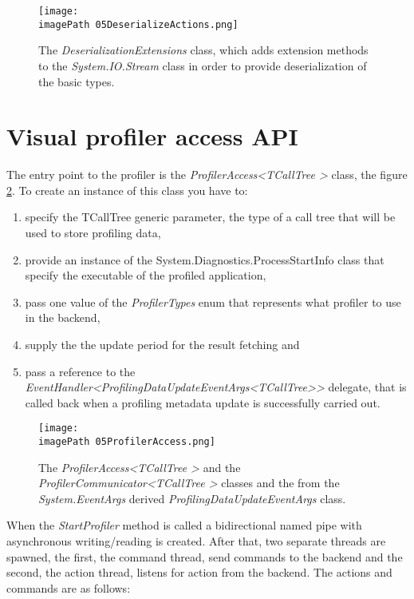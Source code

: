 \begin{figure}
	\centering
		\texttt{[image: \\imagePath 05DeserializeActions.png]}
		\caption{The \textit{DeserializationExtensions} class, which adds extension methods to the \textit{System.IO.Stream} class in order to provide deserialization of the basic types. }
	\label{fig:05DeserializeActions}
\end{figure}

\section{Visual profiler access API}
The entry point to the profiler is the \textit{ProfilerAccess\textless TCallTree \textgreater} class, the figure \ref{fig:05ProfilerAccess}. To create an instance of this class you have to:
\begin{enumerate}

\item specify the TCallTree generic parameter, the type of a call tree that will be used to store profiling data,

\item provide an instance of the System.Diagnostics.ProcessStartInfo class that specify the executable of the profiled application,

\item pass one value of the \textit{ProfilerTypes} enum that represents what profiler to use in the backend,

\item supply the the update period for the result fetching and

\item pass a reference to the \textit{EventHandler\textless ProfilingDataUpdateEventArgs\textless TCallTree\textgreater\textgreater} delegate, that is called back when a profiling metadata update is successfully carried out.
 
\end{enumerate}
\begin{figure}
	\centering
		\texttt{[image: \\imagePath 05ProfilerAccess.png]}
		\caption{The \textit{ProfilerAccess\textless TCallTree \textgreater} and
the \textit{ProfilerCommunicator\textless TCallTree \textgreater} 		
		 classes and the from the \textit{System.EventArgs} derived \textit{ProfilingDataUpdateEventArgs} class. }
	\label{fig:05ProfilerAccess}
\end{figure}

When the \textit{StartProfiler} method is called a bidirectional named pipe with asynchronous writing/reading is created. After that, two separate threads are spawned, the first, the command thread, send commands to the backend and the second, the action thread, listens for action from the backend. The actions and commands are as follows:

